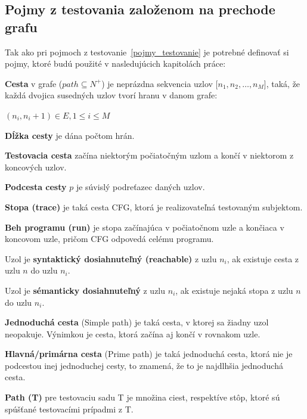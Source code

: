 \subsection*{Pojmy z testovania založenom na prechode grafu}
\label{pojmy_cfg}
Tak ako pri pojmoch z testovanie~\ref{pojmy_testovanie} je potrebné definovať si pojmy, ktoré budú použité v nasledujúcich kapitolách práce:
\begin{description}
	\item\textbf{Cesta} v grafe ($path \subseteq N^+$) je neprázdna sekvencia uzlov [$n_1, n_2, \ldots, n_M$], taká, že každá dvojica susedných uzlov tvorí hranu v danom grafe:
		\begin{center}
			$(n_i, n_i + 1) \in E, 1 \leq i \leq M$
		\end{center}
	\item \textbf{Dĺžka cesty} je dána počtom hrán.
	\item \textbf{Testovacia cesta} začína niektorým počiatočným uzlom a končí v niektorom z koncových uzlov.
	\item \textbf{Podcesta cesty} $p$ je súvislý podreťazec daných uzlov.
	\item \textbf{Stopa (trace)} je taká cesta CFG, ktorá je realizovateľná testovaným subjektom.
	\item \textbf{Beh programu (run)} je stopa začínajúca v počiatočnom uzle a končiaca v koncovom uzle, pričom CFG odpovedá celému programu.
	\item Uzol je \textbf{syntaktický dosiahnuteľný (reachable)} z uzlu $n_i$, ak existuje cesta z uzlu $n$ do uzlu $n_i$.
	\item Uzol je \textbf{sémanticky dosiahnuteľný} z uzlu $n_i$, ak existuje nejaká stopa z uzlu $n$ do uzlu $n_i$.
	\item \textbf{Jednoduchá cesta} (Simple path) je taká cesta, v ktorej sa žiadny uzol neopakuje. Výnimkou je cesta, ktorá začína aj končí v rovnakom uzle.
	\item \textbf{Hlavná/primárna cesta} (Prime path) je taká jednoduchá cesta, ktorá nie je podcestou inej jednoduchej cesty, to znamená, že to je najdlhšia jednoduchá cesta.
	\item \textbf{Path (T)} pre testovaciu sadu T je množina ciest, respektíve stôp, ktoré sú spúšťané testovacími prípadmi z T.
\end{description}


